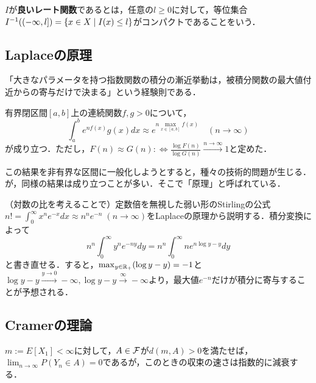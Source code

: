 \documentclass[uplatex,dvipdfmx]{jsreport}
\begin{document}
\begin{definition}
    $I$が\textbf{良いレート関数}であるとは，任意の$l\ge0$に対して，等位集合$I^{-1}((-\infty,l])=\left\{x\in X\mid I(x)\le l\right\}$がコンパクトであることをいう．
\end{definition}

\subsection{Laplaceの原理}

\begin{tcolorbox}[colframe=ForestGreen, colback=ForestGreen!10!white,breakable,colbacktitle=ForestGreen!40!white,coltitle=black,fonttitle=\bfseries\sffamily,
title=]
    「大きなパラメータを持つ指数関数の積分の漸近挙動は，被積分関数の最大値付近からの寄与だけで決まる」という経験則である．
\end{tcolorbox}

\begin{example}
    有界閉区間$[a,b]$上の連続関数$f,g>0$について，
    \[\int^b_ae^{nf(x)}g(x)dx\approx e^{n\max_{x\in[a,b]}f(x)}\quad(n\to\infty)\]
    が成り立つ．ただし，$F(n)\approx G(n):\Leftrightarrow\frac{\log F(n)}{\log G(n)}\xrightarrow{n\to\infty}1$と定めた．
\end{example}
\begin{remark}
    この結果を非有界な区間に一般化しようとすると，種々の技術的問題が生じる．
    が，同様の結果は成り立つことが多い．そこで「原理」と呼ばれている．
\end{remark}

\begin{example}
    （対数の比を考えることで）定数倍を無視した弱い形のStirlingの公式$n!=\int^\infty_0x^ne^{-x}dx\approx n^ne^{-n}\;(n\to\infty)$をLaplaceの原理から説明する．積分変換によって
    \[n^n\int^\infty_0y^ne^{-ny}dy=n^n\int^\infty_0ne^{n\log y-y}dy\]
    と書き直せる．すると，$\max_{y\in\mathbb{R}_+}(\log y-y)=-1$と$\log y-y\xrightarrow{y\to 0}-\infty,\log y-y\xrightarrow{\infty}-\infty$より，最大値$e^{-n}$だけが積分に寄与することが予想される．
\end{example}

\subsection{Cramerの理論}

\begin{tcolorbox}[colframe=ForestGreen, colback=ForestGreen!10!white,breakable,colbacktitle=ForestGreen!40!white,coltitle=black,fonttitle=\bfseries\sffamily,
title=]
    $m:=E[X_1]<\infty$に対して，$A\in\mathcal{F}$が$d(m,A)>0$を満たせば，$\lim_{n\to\infty}P(Y_n\in A)=0$であるが，このときの収束の速さは指数的に減衰する．
\end{tcolorbox}
\end{document}
